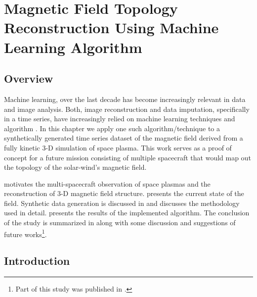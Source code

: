 %
%
\chapter{Magnetic Field Topology Reconstruction Using Machine Learning Algorithm} \label{chap:chap8}

    \section{Overview} \label{sec:ovrvw8}

        Machine learning, over the last decade has become increasingly relevant in data and image
        analysis. Both, image reconstruction and data imputation, specifically in a time series,
        have increasingly relied on machine learning techniques and algorithm \citep{Wang2018,
        Bertsimas2017}. In this chapter we apply one such algorithm/technique to a synthetically
        generated time series dataset of the magnetic field derived from a fully kinetic 3-D
        simulation of space plasma. This work serves as a proof of concept for a future mission
        consisting of multiple spacecraft that would map out the topology of the solar-wind's
        magnetic field.

         motivates the multi-spacecraft observation of space plasmas and the
        reconstruction of 3-D magnetic field structure.  presents the current state
        of the field. Synthetic data generation is discussed in  and
         discusses the methodology used in detail.  presents the
        results of the implemented algorithm. The conclusion of the study is summarized in
         along with some discussion and suggestions of future works\footnote{Part of
        this study was published in \citet{Maruca2021}.}.

    \section{Introduction} \label{sec:intr8}

